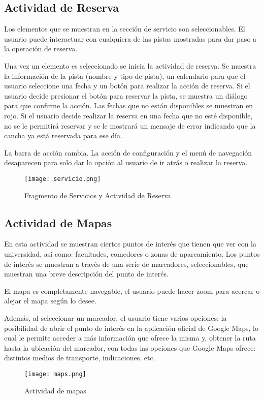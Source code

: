 \subsection{Actividad de Reserva}

Los elementos que se muestran en la sección de servicio son seleccionables. El 
usuario puede interactuar con cualquiera de las pistas mostradas para dar paso 
a la operación de reserva. 

Una vez un elemento es seleccionado se inicia la actividad de reserva. Se muestra 
la información de la pista (nombre y tipo de pista), un calendario para que el 
usuario seleccione una fecha y un botón para realizar la acción de reserva. Si 
el usuario decide presionar el botón para reservar la pista, se muestra un 
diálogo para que confirme la acción. Las fechas que no están disponibles se 
muestran en rojo. Si el usuario decide realizar la reserva en una fecha que no 
esté disponible, no se le permitirá reservar y se le mostrará un mensaje de error 
indicando que la cancha ya está reservada para ese día.

La barra de acción cambia. La acción de configuración y el menú de navegación 
desaparecen para solo dar la opción al usuario de ir atrás o realizar la reserva.

\begin{figure}[h]
	\centering
	\texttt{[image: servicio.png]}
	\caption{Fragmento de Servicios y Actividad de Reserva}
	\label{fig:ejemplo}
\end{figure}

\subsection{Actividad de Mapas}

En esta actividad se muestran ciertos puntos de interés que tienen que ver con la 
universidad, asi como: facultades, comedores o zonas de aparcamiento. Los puntos 
de interés se muestran a través de una serie de marcadores, seleccionables, que 
muestran una breve descripción del punto de interés. 

El mapa es completamente navegable, el usuario puede hacer zoom para acercar o 
alejar el mapa según lo desee.

Además, al seleccionar un marcador, el usuario tiene varios opciones:
la posibilidad de abrir el punto de interés en la aplicación oficial de 
Google Maps, lo cual le permite acceder a más información que ofrece la misma y, 
obtener la ruta hasta la ubicación del marcador, con todas las opciones que 
Google Maps ofrece: distintos medios de transporte, indicaciones, etc.

\begin{figure}[h]
	\centering
	\texttt{[image: maps.png]}
	\caption{Actividad de mapas}
	\label{fig:ejemplo}
\end{figure}